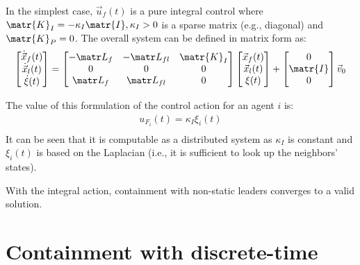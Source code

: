 \begin{description}
        In the simplest case, $\vec{u}_f(t)$ is a pure integral control where $\matr{K}_I = -\kappa_I \matr{I}, \kappa_I>0$ is a sparse matrix (e.g., diagonal) and $\matr{K}_P = 0$. The overall system can be defined in matrix form as:
        \[
            \begin{bmatrix}
                \dot{\x}_f(t) \\ \dot{\x}_l(t) \\ \dot{\xi}(t)
            \end{bmatrix}
            =
            \begin{bmatrix}
                -\lap_f & -\lap_{fl} & \matr{K}_I \\
                0 & 0 & 0 \\
                \lap_f & \lap_{fl} & 0 
            \end{bmatrix}
            \begin{bmatrix}
                \x_f(t) \\ \x_l(t) \\ \xi(t)
            \end{bmatrix}
            +
            \begin{bmatrix}
                0 \\ \matr{I} \\ 0
            \end{bmatrix}
            \vec{v}_0
        \]
\end{description}

\begin{remark}
    The value of this formulation of the control action for an agent $i$ is:
    \[
        \begin{split}
            u_{F_i}(t) = \kappa_I \xi_i(t) \\
        \end{split}
    \]
    It can be seen that it is computable as a distributed system as $\kappa_I$ is constant and $\xi_i(t)$ is based on the Laplacian (i.e., it is sufficient to look up the neighbors' states).
\end{remark}

\begin{theorem}
    With the integral action, containment with non-static leaders converges to a valid solution.
\end{theorem}



\section{Containment with discrete-time}

